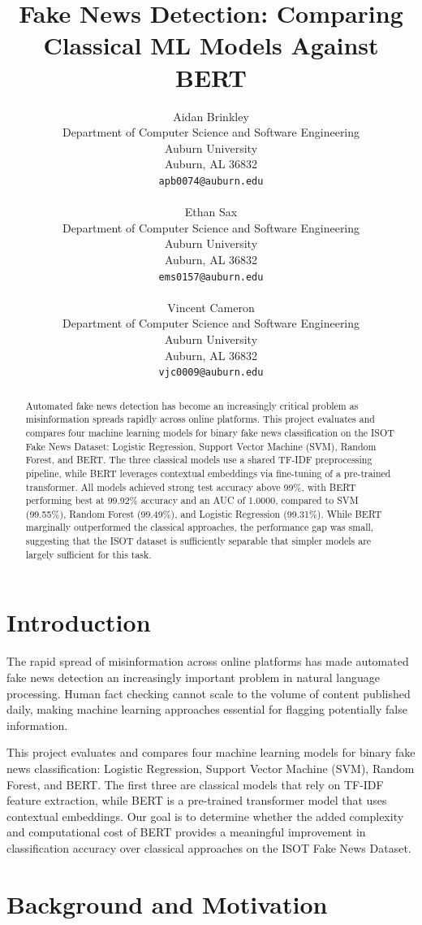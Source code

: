 \documentclass{article}
\title{Fake News Detection: Comparing Classical ML Models Against BERT}
\author{%
  Aidan Brinkley \\
  Department of Computer Science and Software Engineering\\
  Auburn University\\
  Auburn, AL 36832 \\
  \texttt{apb0074@auburn.edu} \\\\
  \And
  Ethan Sax \\
  Department of Computer Science and Software Engineering\\
  Auburn University\\
  Auburn, AL 36832 \\
  \texttt{ems0157@auburn.edu} \\\\
  \And
  Vincent Cameron \\
  Department of Computer Science and Software Engineering\\
  Auburn University\\
  Auburn, AL 36832 \\
  \texttt{vjc0009@auburn.edu} \\
}
\begin{document}
\maketitle

\begin{abstract}
Automated fake news detection has become an increasingly critical problem as misinformation spreads rapidly across online platforms.
This project evaluates and compares four machine learning models for binary fake news classification on the ISOT Fake News Dataset: Logistic Regression, Support Vector Machine (SVM), Random Forest, and BERT.
The three classical models use a shared TF-IDF preprocessing pipeline, while BERT leverages contextual embeddings via fine-tuning of a pre-trained transformer.
All models achieved strong test accuracy above 99\%, with BERT performing best at 99.92\% accuracy and an AUC of 1.0000, compared to SVM (99.55\%), Random Forest (99.49\%), and Logistic Regression (99.31\%).
While BERT marginally outperformed the classical approaches, the performance gap was small, suggesting that the ISOT dataset is sufficiently separable that simpler models are largely sufficient for this task.
\end{abstract}

\section{Introduction}

The rapid spread of misinformation across online platforms has made automated fake news detection an increasingly important problem in natural language processing. Human fact checking cannot scale to the volume of content published daily, making machine learning approaches essential for flagging potentially false information.

This project evaluates and compares four machine learning models for binary fake news classification: Logistic Regression, Support Vector Machine (SVM), Random Forest, and BERT. The first three are classical models that rely on TF-IDF feature extraction, while BERT is a pre-trained transformer model that uses contextual embeddings. Our goal is to determine whether the added complexity and computational cost of BERT provides a meaningful improvement in classification accuracy over classical approaches on the ISOT Fake News Dataset.

\section{Background and Motivation}
\end{document}
